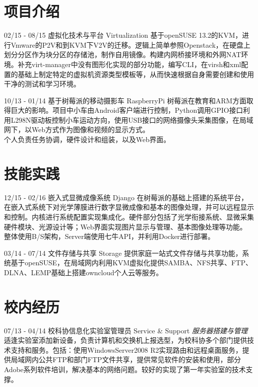 \documentclass[]{friggeri-cv}
\begin{document}
\section{项目介绍}
\begin{entrylist}
  \entry
    {02/15 - 08/15 }
    {虚拟化技术与平台}
    {Virtualization}
    {基于openSUSE 13.2的KVM，进行Vmware的P2V和到KVM下V2V的迁移。逻辑上简单参照Openstack，在硬盘上划分分区作为块分区的存储池，制作自用镜像。构建内网桥接环境和外网NAT环境。补充virt-manager中没有图形化实现的部分功能，编写CLI，在virsh和xml配置的基础上制定特定的虚拟机资源类型模板等，从而快速根据自身需要创建和使用干净的测试和学习环境。
    \\}   

   \entry
   {10/13 - 01/14}
   {基于树莓派的移动摄影车}
   {RaspberryPi}
   {
    树莓派在教育和ARM方面取得巨大的影响。项目中小车由Android客户端进行控制，Python调用GPIO接口利用L298N驱动板控制小车运动方向，使用USB接口的网络摄像头采集图像，在局域网下，以Web方式作为图像和视频的显示方式。\\
    个人负责任务协调，硬件设计和组装，以及Web界面。
   }
   
\end{entrylist}

\section{技能实践}
\begin{entrylist}
  \entry
    {12/15 - 02/16}
    {嵌入式显微成像系统}
    {Django}
    {在树莓派的基础上搭建的系统平台，在嵌入式系统下对光学薄膜进行数字显微成像和基本的图像处理，并可以远程显示和控制。内核进行系统配置实现集成化。硬件部分包括了光学衔接系统、显微采集硬件模块、光源设计等；Web界面实现图片显示与管理、基本图像处理等功能。\\
    整体使用B/S架构，Server端使用七牛API，并利用Docker进行部署。
   \\ }%
  
  
  \entry
    {03/14 - 07/14 }
    {文件存储与共享}
    {Storage}
    {提供家庭一站式文件存储与共享功能，系统基于openSUSE，在局域网内利用KVM虚拟化提供SAMBA、NFS共享、FTP、DLNA、LEMP基础上搭建owncloud个人云等服务。\\}
    



\end{entrylist}

\section{校内经历}
\begin{entrylist}
  \entry
    {07/13 - 04/14}
    {校科协信息化实验室管理员}
    {Service \& Support}
    {\emph{服务器搭建与管理}
    适逢实验室添加新设备，负责计算机和交换机上报选型，为校科协多个部门提供技术支持和服务。包括：使用WindowsServer2008 R2实现路由和远程桌面服务，提供局域网内公共FTP和部门FTP文件共享，提供常见软件的安装和使用，部分Adobe系列软件培训，解决基本的网络问题。较好的实现了第一年实验室的技术支撑。  \\     
    }
    
\end{entrylist}
\end{document}
